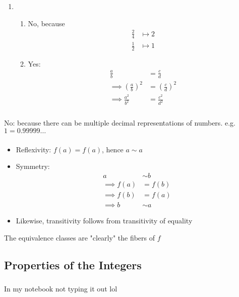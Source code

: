 \documentclass{article}
\begin{document}
\subsubsection{}
\begin{enumerate}
\item \begin{enumerate}
\item
No, because
\begin{align*}
\frac{2}{4} &\mapsto 2\\
\frac{1}{2} &\mapsto 1
\end{align*}
\item
Yes:
\begin{align*}
\frac{a}{b} &= \frac{c}{d}\\
\implies (\frac{a}{b})^2 &= (\frac{c}{d})^2\\
\implies \frac{a^2}{b^2} &= \frac{c^2}{d^2}
\end{align*}
\end{enumerate}
\end{enumerate}
\subsubsection{}
No: because there can be multiple decimal representations of numbers. e.g. $1 = 0.99999\ldots$
\subsubsection{}
\begin{itemize}
\item Reflexivity:
$f(a) = f(a)$, hence $a \sim a$
\item Symmetry:
\begin{align*}
a &\sim b\\
\implies f(a) &= f(b)\\
\implies f(b) &= f(a)\\
\implies b &\sim a
\end{align*}
\item Likewise, transitivity follows from transitivity of equality\end{itemize}
 The equivalence classes are "clearly" the fibers of $f$

\subsection{Properties of the Integers}
\subsubsection{}
In my notebook not typing it out lol
\end{document}
